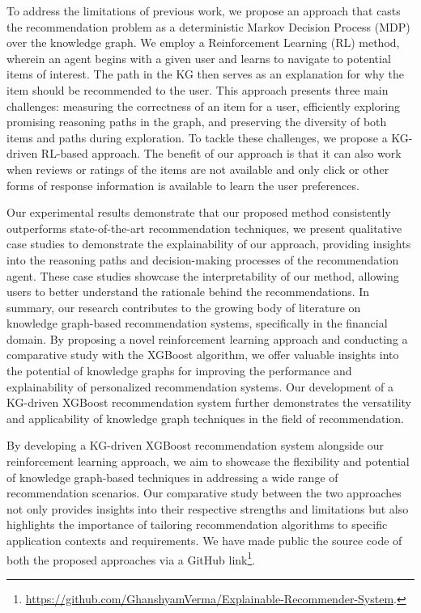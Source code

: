 \documentclass[11pt]{article}
\begin{document}
To address the limitations of previous work, we propose an approach that casts the recommendation problem as a deterministic Markov Decision Process (MDP) over the knowledge graph. We employ a Reinforcement Learning (RL) method, wherein an agent begins with a given user and learns to navigate to potential items of interest. The path in the KG then serves as an explanation for why the item should be recommended to the user. This approach presents three main challenges: measuring the correctness of an item for a user, efficiently exploring promising reasoning paths in the graph, and preserving the diversity of both items and paths during exploration. To tackle these challenges, we propose a KG-driven RL-based approach. The benefit of our approach is that it can also work when reviews or ratings of the items are not available and only click or other forms of response information is available to learn the user preferences.

Our experimental results demonstrate that our proposed method consistently outperforms state-of-the-art recommendation techniques, we present qualitative case studies to demonstrate the explainability of our approach, providing insights into the reasoning paths and decision-making processes of the recommendation agent. These case studies showcase the interpretability of our method, allowing users to better understand the rationale behind the recommendations.
In summary, our research contributes to the growing body of literature on knowledge graph-based recommendation systems, specifically in the financial domain. By proposing a novel reinforcement learning approach and conducting a comparative study with the XGBoost algorithm, we offer valuable insights into the potential of knowledge graphs for improving the performance and explainability of personalized recommendation systems. Our development of a KG-driven XGBoost recommendation system further demonstrates the versatility and applicability of knowledge graph techniques in the field of recommendation.

By developing a KG-driven XGBoost recommendation system alongside our reinforcement learning approach, we aim to showcase the flexibility and potential of knowledge graph-based techniques in addressing a wide range of recommendation scenarios. Our comparative study between the two approaches not only provides insights into their respective strengths and limitations but also highlights the importance of tailoring recommendation algorithms to specific application contexts and requirements. We have made public the source code of both the proposed approaches via a GitHub link\footnote{\url{https://github.com/GhanshyamVerma/Explainable-Recommender-System}.}.
\end{document}
